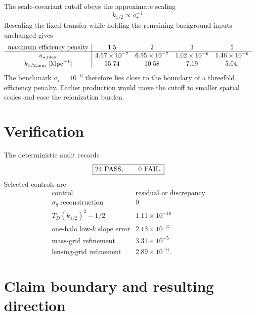 The scale-covariant cutoff obeys the approximate scaling
\begin{equation}
 k_{1/2}\propto a_\star^{-1}.
 \label{eq:nlh-cutoff-scaling}
\end{equation}
Rescaling the fixed transfer while holding the remaining background inputs unchanged gives
\begin{equation}
 \begin{array}{c|cccc}
 \text{maximum efficiency penalty}
 &1.5&2&3&5\\
 \hline
 a_{\star,\max}
 &4.67\times10^{-7}
 &6.95\times10^{-7}
 &1.02\times10^{-6}
 &1.46\times10^{-6}\\
 k_{1/2,\min}\ [{\rm Mpc}^{-1}]
 &15.74&10.58&7.19&5.04.
 \end{array}
 \label{eq:nlh-production-bounds}
\end{equation}
The benchmark $a_\star=10^{-6}$ therefore lies close to the boundary of a threefold efficiency penalty.  Earlier production would move the cutoff to smaller spatial scales and ease the reionization burden.

\section{Verification}

The deterministic audit records
\begin{equation}
 \boxed{
 24\ {\rm PASS},
 \qquad
 0\ {\rm FAIL}.
 }
 \label{eq:nlh-pass-count}
\end{equation}
Selected controls are
\begin{equation}
 \begin{array}{c|c}
 \text{control}&\text{residual or discrepancy}\\
 \hline
 \sigma_8\ \text{reconstruction}&0\\
 T_D(k_{1/2})^2-1/2&1.11\times10^{-16}\\
 \text{one-halo low-}k\text{ slope error}&2.13\times10^{-3}\\
 \text{mass-grid refinement}&3.31\times10^{-5}\\
 \text{lensing-grid refinement}&2.89\times10^{-6}.
 \end{array}
 \label{eq:nlh-verification-table}
\end{equation}

\section{Claim boundary and resulting direction}

